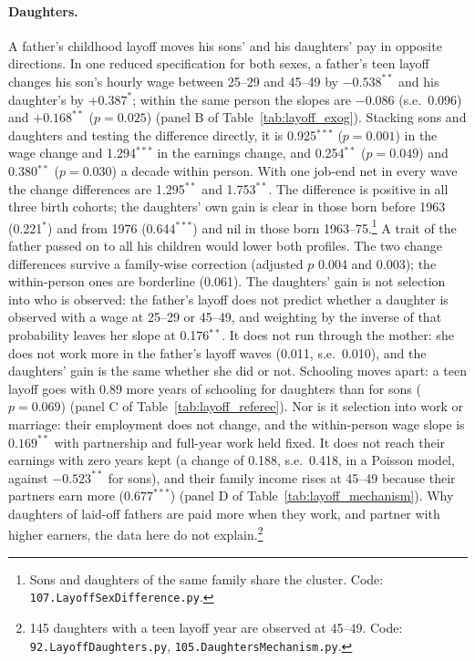 \paragraph{Daughters.} A father's childhood layoff moves his sons' and his daughters' pay in opposite directions. In
one reduced specification for both sexes, a father's teen layoff changes his son's hourly wage between 25--29 and 45--49
by $-0.538^{**}$ and his daughter's by $+0.387^{*}$; within the same person the slopes are $-0.086$ (s.e.\ 0.096) and
$+0.168^{**}$ ($p = 0.025$) (panel B of Table~\ref{tab:layoff_exog}). Stacking sons and daughters and testing the
difference directly, it is 0.925$^{***}$ ($p = 0.001$) in the wage change and 1.294$^{***}$ in the earnings change, and
0.254$^{**}$ ($p = 0.049$) and 0.380$^{**}$ ($p = 0.030$) a decade within person. With one job-end net in every wave the
change differences are 1.295$^{**}$ and 1.753$^{**}$. The difference is positive in all three birth cohorts; the
daughters' own gain is clear in those born before 1963 (0.221$^{*}$) and from 1976 (0.644$^{***}$) and nil in those born
1963--75.\footnote{Sons and daughters of the same family share the cluster. Code: \texttt{107.LayoffSexDifference.py}.}
A trait of the father passed on to all his children would lower both profiles. The two change differences survive a
family-wise correction (adjusted $p$ 0.004 and 0.003); the within-person ones are borderline (0.061). The daughters' gain
is not selection into who is observed: the father's layoff does not predict whether a daughter is observed with a wage at
25--29 or 45--49, and weighting by the inverse of that probability leaves her slope at 0.176$^{**}$. It does not run
through the mother: she does not work more in the father's layoff waves (0.011, s.e.\ 0.010), and the daughters' gain is
the same whether she did or not. Schooling moves apart: a teen layoff goes with 0.89 more years of schooling for
daughters than for sons ($p = 0.069$) (panel C of Table~\ref{tab:layoff_referee}). Nor is it selection into
work or marriage: their employment does not change, and the within-person wage slope is $0.169^{**}$ with partnership
and full-year work held fixed. It does not reach their earnings with zero years kept (a change of 0.188, s.e.\ 0.418,
in a Poisson model, against $-0.523^{**}$ for sons), and their family income rises at 45--49 because their partners earn
more ($0.677^{***}$) (panel D of Table~\ref{tab:layoff_mechanism}). Why daughters of laid-off fathers are paid more when
they work, and partner with higher earners, the data here do not explain.\footnote{145 daughters with a teen layoff year
are observed at 45--49. Code: \texttt{92.LayoffDaughters.py}, \texttt{105.DaughtersMechanism.py}.}


